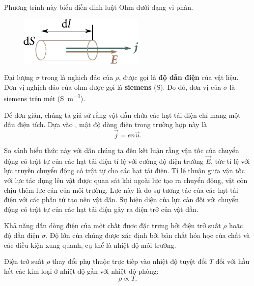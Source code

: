 \noindent
Phương trình này biểu diễn định luật Ohm dưới dạng vi phân.

\begin{figure}[!htb]
	\begin{center}
		\includegraphics[scale=1]{figures/ch_05/fig_5_4.pdf}
		\caption[]{}
		\label{fig:5_4}
	\end{center}
	\vspace{-0.8cm}
\end{figure}

Đại lượng $\sigma$ trong  là nghịch đảo của $\rho$, được gọi là \textbf{độ dẫn điện} của vật liệu. Đơn vị nghịch đảo của ohm được gọi là \textbf{siemens} (\si{\siemens}). Do đó, đơn vị của $\sigma$ là siemens trên mét (\si{\siemens\per\metre}).

Để đơn giản, chúng ta giả sử rằng vật dẫn chứa các hạt tải điện chỉ mang một dấu điện tích. Dựa vào , mật độ dòng điện trong trường hợp này là
\begin{equation}\label{eq:5_23}
    \vec{j} = e n \vec{u}.
\end{equation}

\noindent
So sánh biểu thức này với  dẫn chúng ta đến kết luận rằng vận tốc của chuyển động có trật tự của các hạt tải điện tỉ lệ với cường độ điện trường $\vec{E}$, tức tỉ lệ với lực truyền chuyển động có trật tự cho các hạt tải điện. Tỉ lệ thuận giữa vận tốc với lực tác dụng lên vật được quan sát khi ngoài lực tạo ra chuyển động, vật còn chịu thêm lực cản của môi trường. Lực này là do sự tương tác của các hạt tải điện với các phần tử tạo nên vật dẫn. Sự hiện diện của lực cản đối với chuyển động có trật tự của các hạt tải điện gây ra điện trở của vật dẫn.

Khả năng dẫn dòng điện của một chất được đặc trưng bởi điện trở suất $\rho$ hoặc độ dẫn điện $\sigma$. Độ lớn của chúng được xác định bởi bản chất hóa học của chất và các điều kiện xung quanh, cụ thể là nhiệt độ môi trường. 

Điện trở suất $\rho$ thay đổi phụ thuộc trực tiếp vào nhiệt độ tuyệt đối $T$ đối với hầu hết các kim loại ở nhiệt độ gần với nhiệt độ phòng:
\begin{equation}\label{eq:5_24}
    \rho \propto T.
\end{equation}

